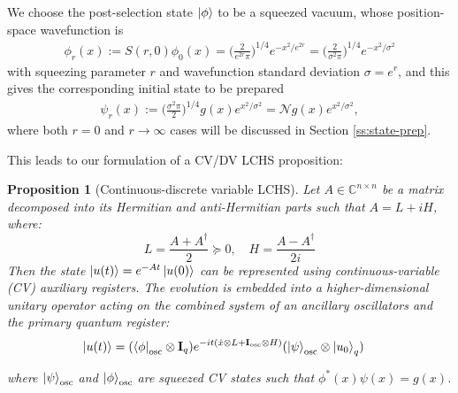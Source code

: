 \documentclass{article}
\newtheorem{proposition}{Proposition}
\newcommand{\dd}{\mathrm{d}}
\begin{document}
We choose the post-selection state $\ket{\phi}$ to be a squeezed vacuum, whose position-space wavefunction is 
\begin{align}
    \phi_r(x):=S(r,0)\phi_0(x)=\bigg(\frac{2}{e^{2r}\pi}\bigg)^{1/4} e^{-x^2/e^{2r}}=\bigg(\frac{2}{\sigma^2\pi}\bigg)^{1/4} e^{-x^2/\sigma^2}
\end{align} 
with squeezing parameter $r$ and wavefunction standard deviation $\sigma=e^r$, and this gives the corresponding initial state to be prepared 
\begin{align}
    \psi_r(x):=\bigg(\frac{\sigma^2\pi}{2}\bigg)^{1/4}g(x)e^{x^2/\sigma^2}= \mathcal{N}g(x)e^{x^2/\sigma^2},
\end{align}
where both $r =0$ and $r \rightarrow \infty$ cases will be discussed in Section \ref{ss:state-prep}.

This leads to our formulation of a CV/DV LCHS proposition:
\begin{proposition}[Continuous-discrete variable LCHS]
Let $A \in \mathbb{C}^{n \times n}$ be a matrix decomposed into its Hermitian and anti-Hermitian parts such that $A = L + iH$, where:
    $$L = \frac{A + A^{\dagger}}{2} \succeq 0, \quad H = \frac{A - A^{\dagger}}{2i}$$
    Then the state $\ket{u(t)} = e^{-At}\ket{u(0)}$ can be represented using continuous-variable (CV) auxiliary registers. 
    The evolution is embedded into a higher-dimensional unitary operator acting on the combined system of an ancillary oscillators and the primary quantum register:
    \begin{align}
        \ket{u(t)}
        &= (\bra{\phi}_{\rm osc}\otimes\mathbf{I}_q)  e^{-it ( \hat{x} \otimes  L+ \mathbf{I}_{\rm osc} \otimes  H )} (\ket{\psi}_{\rm osc}\otimes\ket{u_0}_q)
    \end{align}


    \textit{where $\ket{\psi}_{\rm osc}$ and $\ket{\phi}_{\rm osc}$ are squeezed CV states such that $\phi^*(x)\psi(x)=g(x)$.}
\end{proposition}




\end{document}
